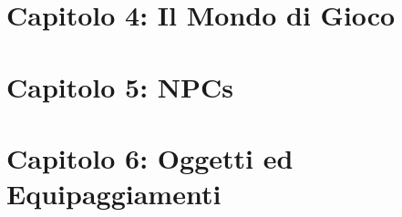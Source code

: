 \documentclass[10pt,twoside, twocolumn, openany,nodeprecatedcode]{dndbook}
\begin{document}



\chapter{Capitolo 4: Il Mondo di Gioco} %


\chapter{Capitolo 5: NPCs} %


\chapter{Capitolo 6: Oggetti ed Equipaggiamenti} %


\end{document}
